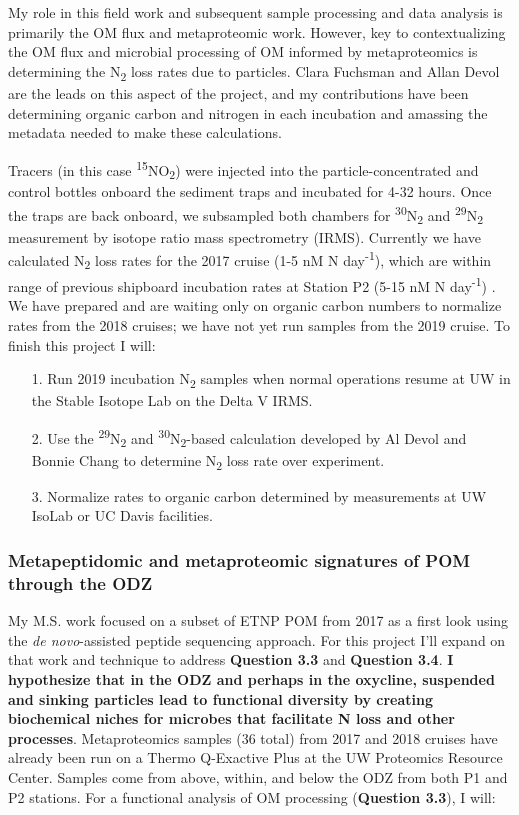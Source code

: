 \documentclass[12pt, letterpaper, twoside]{article}
\begin{document}
My role in this field work and subsequent sample processing and data analysis is primarily the OM flux and metaproteomic work. However, key to contextualizing the OM flux and microbial processing of OM informed by metaproteomics is determining the N\textsubscript{2} loss rates due to particles. Clara Fuchsman and Allan Devol are the leads on this aspect of the project, and my contributions have been determining organic carbon and nitrogen in each incubation and amassing the metadata needed to make these calculations. 

Tracers (in this case \textsuperscript{15}NO\textsubscript{2}) were injected into the particle-concentrated and control bottles onboard the sediment traps and incubated for 4-32 hours. Once the traps are back onboard, we subsampled both chambers for \textsuperscript{30}N\textsubscript{2} and \textsuperscript{29}N\textsubscript{2} measurement by isotope ratio mass spectrometry (IRMS). Currently we have calculated N\textsubscript{2} loss rates for the 2017 cruise (1-5 nM N day\textsuperscript{-1}), which are within range of previous shipboard incubation rates at Station P2 (5-15 nM N day\textsuperscript{-1}) \cite{babbin_organic_2014}. We have prepared and are waiting only on organic carbon numbers to normalize rates from the 2018 cruises; we have not yet run samples from the 2019 cruise. To finish this project I will:

\begin{enumerate}
	\item[1.] Run 2019 incubation N\textsubscript{2} samples when normal operations resume at UW in the Stable Isotope Lab on the Delta V IRMS. 
	\item[2.] Use the \textsuperscript{29}N\textsubscript{2} and \textsuperscript{30}N\textsubscript{2}-based calculation developed by Al Devol and Bonnie Chang to determine N\textsubscript{2} loss rate over experiment. 
	\item [3.] Normalize rates to organic carbon determined by measurements at UW IsoLab or UC Davis facilities. 
\end{enumerate}

\subsubsection{Metapeptidomic and metaproteomic signatures of POM through the ODZ}

My M.S. work focused on a subset of ETNP POM from 2017 as a first look using the \textit{de novo}-assisted peptide sequencing approach. For this project I'll expand on that work and technique to address \textbf{Question 3.3} and \textbf{Question 3.4}. \textbf{I hypothesize that in the ODZ and perhaps in the oxycline, suspended and sinking particles lead to functional diversity by creating biochemical niches for microbes that  facilitate N loss and other processes}. Metaproteomics samples (36 total) from 2017 and 2018 cruises have already been run on a Thermo Q-Exactive Plus at the UW Proteomics Resource Center. Samples come from above, within, and below the ODZ from both P1 and P2 stations. For a functional analysis of OM processing (\textbf{Question 3.3}), I will:
\end{document}
